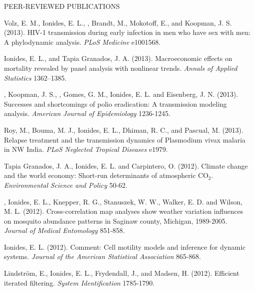 \begin{reflist}{PEER-REVIEWED PUBLICATIONS}
\item\formal{[[\volz] ] }
Volz, E. M., Ionides, E. L., , Brandt, M., Mokotoff, E., and Koopman, J. S. (2013). HIV-1 transmission during early infection in men who have sex with men: A phylodynamic analysis.
{\em PLoS Medicine} {}{\separator}e1001568.

\item\formal{[[\ionidesAOAS] ] }
Ionides, E. L.,  and Tapia Granados, J. A. 
(2013). 
Macroeconomic effects on mortality revealed by panel analysis with nonlinear trends. {\em Annals of Applied Statistics} {}{\separator}1362–1385.

\item\formal{[[\mayerAJE] ] }
, Koopman, J. S., , Gomes, G. M., Ionides, E. L. and Eisenberg, J. N. (2013). Successes and shortcomings of polio eradication:  A transmission modeling analysis. {\em American Journal of Epidemiology} {}{\separator}1236-1245. 

\item\formal{[[\royPLOSNTD] ] }
Roy, M., Bouma, M. J., Ionides, E. L., Dhiman, R. C., and Pascual, M. 
(2013). Relapse treatment and the transmission dynamics of Plasmodium vivax malaria in NW India. {\em PLoS Neglected Tropical Diseases} {}{\separator}e1979.

\item\formal{[[\tapiaESP] ] }
Tapia Granados, J. A., Ionides, E. L.  and Carpintero, O. (2012). Climate change and the world economy: Short-run determinants of atmospheric $\mathrm{CO}_2$. {\em Environmental Science and Policy} {}{\separator}50-62.

\item\formal{[[\chuangJME] ] }
, Ionides, E. L., Knepper, R. G., Stanuszek, W. W., Walker, E. D. and Wilson, M. L. (2012).
Cross-correlation map analyses show weather variation influences on mosquito abundance patterns in Saginaw county, Michigan, 1989-2005. {\em Journal of Medical Entomology} {}{\separator}851-858.

\item\formal{[[\ionidesJASA] ]}
Ionides, E. L. (2012). Comment: Cell motility models and inference for dynamic systems. {\em Journal of the American Statistical Association} {}{\separator}865-868.

\item\formal{[[\lindstromIFAC] ]} 
Lindstr\"{o}m, E., Ionides, E. L., Frydendall, J., and Madsen, H. (2012). Efficient iterated filtering. 
{\em System Identification} {}{\separator}1785-1790.


\end{reflist}
